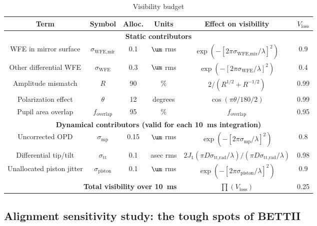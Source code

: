 \begin{table}[!ht]
\begin{center}
\caption{Visibility budget}
\label{tb:Budget}
\begin{tabular}{|c||c|c|c|c|c|}
\hline 
Term & Symbol & Alloc. & Units & Effect on visibility \citep{Lawson:2000vf} & $V_\textrm{loss}$  \\ 

\hline 
\hline 
\multicolumn{6}{|c|}{\textbf{Static contributors}} \\ 
\hline
WFE in mirror surface & $\sigma_\textrm{WFE,mir}$ & 0.1 & $\um$ rms & $\exp(-[2\pi\sigma_\textrm{WFE,mir}/\lambda]^2)$ & 0.9 \\ 
\hline 
Other differential WFE & $\sigma_\textrm{WFE}$ & 0.3 &$\um$ rms & $\exp(-[2\pi\sigma_\textrm{WFE}/\lambda]^2)$ & 0.4 \\ 
\hline 
Amplitude mismatch & $R$ & 90 & \% & $2/(R^{1/2}+R^{-1/2})$ & 0.99 \\ 
\hline 
Polarization effect & $\theta$ & 12 & degrees & $\cos(\pi\theta/180/2)$ & 0.99 \\ 
\hline 
Pupil area overlap & $f_\textrm{overlap}$ & 95 & \% & $f_\textrm{overlap}$ & 0.95 \\ 

\hline
\hline
\multicolumn{6}{|c|}{\textbf{Dynamical contributors (valid for each 10~ms integration)}} \\ 
\hline
Uncorrected OPD & $\sigma_\textrm{mp}$ & 0.15 & $\um$ rms & $\exp(-[2\pi\sigma_{\textrm{mp}}/\lambda]^2)$ & 0.8 \\ 
\hline 
Differential tip/tilt & $\sigma_\textrm{tt}$ & 0.1 & asec rms & $2J_1(\pi D\sigma_\textrm{tt,rad}/\lambda)/(\pi D\sigma_\textrm{tt,rad}/\lambda)$ & 0.98 \\ 
\hline 
Unallocated piston jitter & $\sigma_\textrm{piston}$ & 0.1 & $\um$ rms& $\exp(-[2\pi\sigma_\textrm{piston}/\lambda]^2)$ & 0.9  \\ 
\hline 
\hline
\multicolumn{4}{|r|}{\textbf{Total visibility over 10~ms}} & $\prod (V_\textrm{loss})$ & 0.25 \\ 
\hline

\end{tabular} 
\end{center}
\end{table}

\subsection{Alignment sensitivity study: the tough spots of BETTII}\label{subsec:SENSITIVITY}

